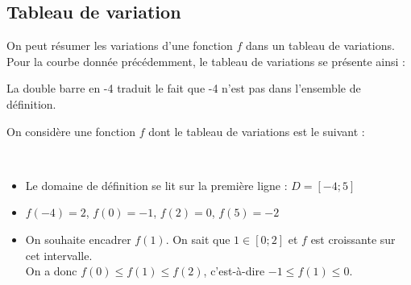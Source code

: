 \newpage

\subsection{Tableau de variation}

On peut résumer les variations d'une fonction $f$ dans un tableau de variations. Pour la courbe donnée précédemment, le tableau de variations se présente ainsi :

\begin{center}
\end{center}

La double barre en -4 traduit le fait que -4 n'est pas dans l'ensemble de définition.

\begin{Exemple}

On considère une fonction $f$ dont le tableau de variations est le suivant : \\
 \begin{minipage}[c]{.45\textwidth}
\begin{center}
\end{center}
\end{minipage} \hfill \begin{minipage}[c]{.5\textwidth}
$ $ \\
\begin{itemize}[label=\textcolor{Couleur10}{$\bullet$}]
    \item Le domaine de définition se lit sur la première ligne : $D = [-4; 5]$
    \item $f(-4) = 2$, $f(0) = -1$, $f(2) = 0$, $f(5) = -2$
    \item On souhaite encadrer $f(1)$. On sait que $1 \in [0; 2]$ et $f$ est croissante sur cet intervalle. \\
    On a donc $f(0) \leq f(1) \leq f(2)$, c'est-à-dire $-1 \leq f(1) \leq 0$.
\end{itemize}
\end{minipage}

\end{Exemple}

